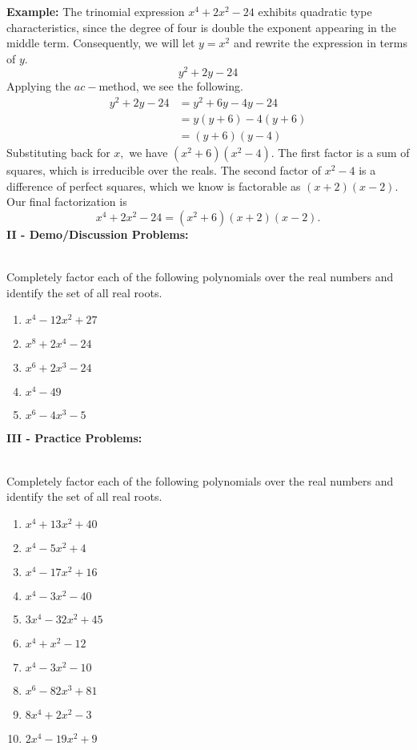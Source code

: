 \documentclass[12pt]{article}
\theoremstyle{definition}
\begin{document}
{\bf Example:} The trinomial expression $x^4+2x^2-24$ exhibits quadratic type characteristics, since the degree of four is double the exponent appearing in the middle term.  Consequently, we will let $y=x^2$ and rewrite the expression in terms of $y$.
$$y^2+2y-24$$
Applying the $ac-$method, we see the following.
\begin{equation*}
\begin{split}
y^2+2y-24 & = y^2+6y-4y-24\\
&=y\left(y+6\right)-4\left(y+6\right)\\
&=\left(y+6\right)\left(y-4\right)
\end{split}
\end{equation*}
Substituting back for $x,$ we have $\left(x^2+6\right)\left(x^2-4\right)$.  The first factor is a sum of squares, which is irreducible over the reals.  The second factor of $x^2-4$ is a difference of perfect squares, which we know is factorable as $\left(x+2\right)\left(x-2\right)$. Our final factorization is
$$x^4+2x^2-24=\left(x^2+6\right)\left(x+2\right)\left(x-2\right).$$
\newpage
{\bf II - Demo/Discussion Problems:}\\
\ \par
Completely factor each of the following polynomials over the real numbers and identify the set of all real roots.
\begin{enumerate}
\item $x^4-12x^2+27$
\item $x^8+2x^4-24$
\item $x^6+2x^3-24$
\item $x^4-49$
\item $x^6-4x^3-5$
\end{enumerate}
{\bf III - Practice Problems:}\\
\ \par
Completely factor each of the following polynomials over the real numbers and identify the set of all real roots.
\begin{multicols}{2}
\begin{enumerate}
  \item  $x^4 +13x^2+40$
  \item  $x^4-5x^2+4$
  \item  $x^4 -17x^2+16$
  \item  $x^4 -3x^2-40$
  \item  $3x^4 -32x^2+45$
	\item  $x^4 +x^2-12$
  \item  $x^4 -3x^2-10$
  \item  $x^6 -82x^3+81$
  \item  $8x^4 +2x^2-3$
  \item  $2x^4 -19x^2+9$
\end{enumerate}
\end{multicols}
\newpage
\ \newpage
\end{document}
